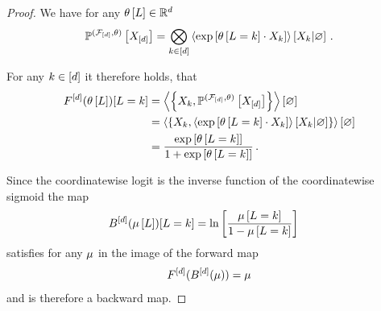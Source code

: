 \begin{proof}
	We have for any $\theta\left[L\right]\in\mathbb{R}^{d}$
		\[ \mathbb{P}^{(\mathcal{F}_{[d]},\theta)}\left[X_{[d]}\right] 
		= \bigotimes_{k\in[d]} \left\langle \mathrm{exp}\left[\theta\left[L=k\right]\cdot X_{k}\right]\right\rangle \left[ X_{k} | \varnothing \right]  \, . \]

	
	For any $k\in[d]$ it therefore holds, that
	\begin{align*}
		F^{[d]}(\theta\left[L\right])[L=k] 
		&=\left\langle \left\{X_{k},  \mathbb{P}^{(\mathcal{F}_{[d]},\theta)}\left[X_{[d]}\right]\right\}\right\rangle \left[ \varnothing \right] \\
		&=\left\langle \left\{X_{k},  \left\langle \mathrm{exp}\left[\theta\left[L=k\right]\cdot X_{k}\right]\right\rangle \left[ X_{k} | \varnothing \right]\right\}\right\rangle \left[ \varnothing \right] \\
		& = \frac{\mathrm{exp}\left[\theta\left[L=k\right]\right]}{1+\mathrm{exp}\left[\theta\left[L=k\right]\right]} \, .
	\end{align*}
	
	Since the coordinatewise logit is the inverse function of the coordinatewise sigmoid the map
	\begin{align*}
		B^{[d]}(\mu\left[L\right])[L=k] 
		& = \ln \left[ \frac{\mu\left[L=k\right]}{1- \mu\left[L=k\right]} \right]
	\end{align*}
	satisfies for any $\mu$ in the image of the forward map
	\begin{align*}
		F^{[d]}(B^{[d]}(\mu)) = \mu 
	\end{align*}
	and is therefore a backward map.
\end{proof}



